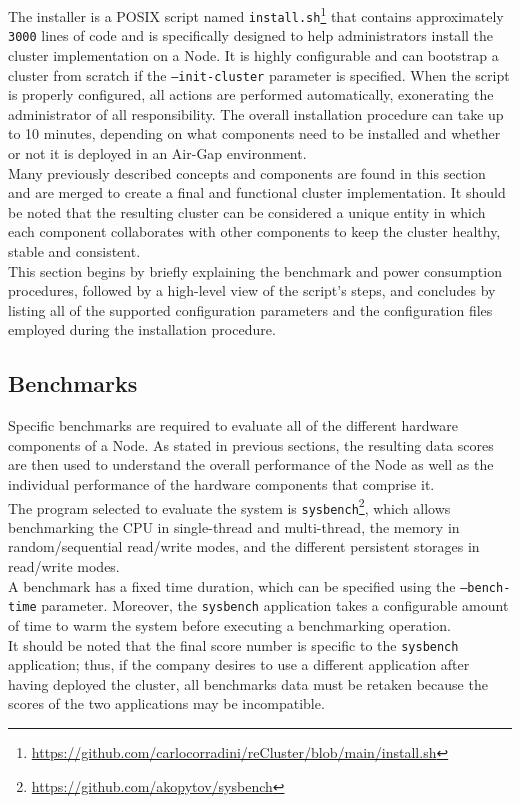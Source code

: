 The installer is a POSIX script named \texttt{install.sh}\footnote{\url{https://github.com/carlocorradini/reCluster/blob/main/install.sh}}
that contains approximately \texttt{3000} lines of code and is specifically designed
to help administrators install the cluster implementation on a Node. It is
highly configurable and can bootstrap a cluster from scratch if the \texttt{--init-cluster}
parameter is specified. When the script is properly configured, all actions are performed
automatically, exonerating the administrator of all responsibility. The overall installation
procedure can take up to 10 minutes, depending on what components need to be
installed and whether or not it is deployed in an Air-Gap environment. \\ %
Many previously described concepts and components are found in this section and
are merged to create a final and functional cluster implementation. It should be
noted that the resulting cluster can be considered a unique entity in which each
component collaborates with other components to keep the cluster healthy, stable
and consistent. \\ %
This section begins by briefly explaining the benchmark and power consumption
procedures, followed by a high-level view of the script's steps, and concludes
by listing all of the supported configuration parameters and the configuration
files employed during the installation procedure.

\subsection{Benchmarks}
\label{subsec:implementation_installer_benchmarks}

Specific benchmarks are required to evaluate all of the different hardware components
of a Node. As stated in previous sections, the resulting data scores are then used
to understand the overall performance of the Node as well as the individual performance
of the hardware components that comprise it. \\ %
The program selected to evaluate the system is \texttt{sysbench}\footnote{\url{https://github.com/akopytov/sysbench}},
which allows benchmarking the CPU in single-thread and multi-thread, the memory
in random/sequential read/write modes, and the different persistent storages in read/write
modes. \\ %
A benchmark has a fixed time duration, which can be specified using the \texttt{--bench-time}
parameter. Moreover, the \texttt{sysbench} application takes a configurable
amount of time to warm the system before executing a benchmarking operation. \\ %
It should be noted that the final score number is specific to the \texttt{sysbench}
application; thus, if the company desires to use a different application after having
deployed the cluster, all benchmarks data must be retaken because the scores of
the two applications may be incompatible.

